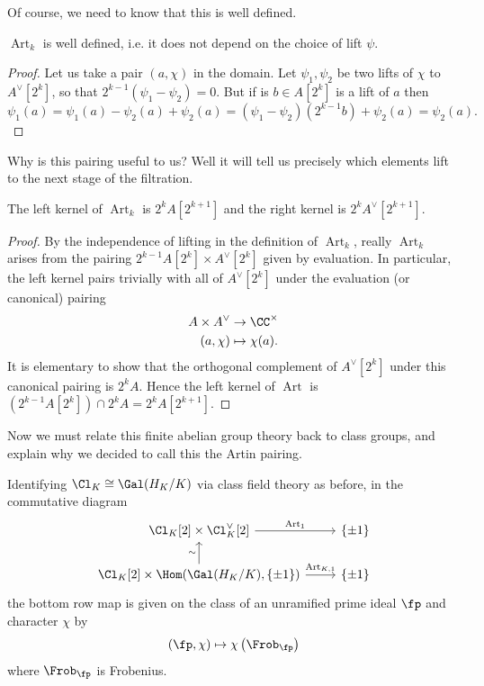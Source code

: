 \documentclass{lecturenotes}
\newcommand{\Art}{\operatorname{Art}}
\numberwithin{equation}{section}
\begin{document}
Of course, we need to know that this is well defined.
\begin{lemma}\label{lem:L2fact1}
    $\Art_k$ is well defined, i.e. it does not depend on the choice of lift $\psi$.
\end{lemma}
\begin{proof}
    Let us take a pair $(a,\chi)$ in the domain.  Let $\psi_1,\psi_2$ be two lifts of $\chi$ to $A^\vee[2^k]$, so that $2^{k-1}(\psi_1-\psi_2)=0$.  But if is $b\in A[2^k]$ is a lift of $a$ then 
    \[\psi_1(a)=\psi_1(a)-\psi_2(a)+\psi_2(a)=(\psi_1-\psi_2)(2^{k-1}b)+\psi_2(a)=\psi_2(a).\]
\end{proof}
Why is this pairing useful to us?  Well it will tell us precisely which elements lift to the next stage of the filtration.
\begin{lemma}\label{lem:L2fact2}
    The left kernel of $\Art_k$ is $2^kA[2^{k+1}]$ and the right kernel is $2^kA^\vee[2^{k+1}]$.
\end{lemma}
\begin{proof}
    By the independence of lifting in the definition of $\Art_k$, really $\Art_k$ arises from the pairing $2^{k-1}A[2^k]\times A^\vee[2^k]$ given by evaluation.  In particular, the left kernel pairs trivially with all of $A^\vee[2^k]$ under the evaluation (or canonical) pairing
    \begin{align*}
    A\times A^\vee&\to \CC^\times\\
    (a,\chi)&\mapsto \chi(a).
    \end{align*}
    It is elementary to show that the orthogonal complement of $A^\vee[2^k]$ under this canonical pairing is $2^kA$.  Hence the left kernel of $\Art$ is $(2^{k-1}A[2^k])\cap 2^kA=2^kA[2^{k+1}]$.
\end{proof}
Now we must relate this finite abelian group theory back to class groups, and explain why we decided to call this the Artin pairing.
\begin{lemma}\label{lem:L2fact3}  Identifying $\Cl_K\cong \Gal(H_K/K)$ via class field theory as before, in the commutative diagram
    \[\begin{tikzcd}
        \Cl_K[2]\times \Cl^\vee_K[2]\ar[r,"\Art_{1}"]&\set{\pm 1}\\
        \Cl_K[2]\times \Hom(\Gal(H_K/K), \set{\pm 1})\ar[r,"\Art_{K,1}"]\ar[u,"\sim"]&\set{\pm 1}
    \end{tikzcd}\]
    the bottom row map is given on the class of an unramified prime ideal $\fp$ and character $\chi$ by
    \[(\fp,\chi)\mapsto \chi\braces{\Frob_\fp}\]
    where $\Frob_\fp$ is Frobenius.
\end{lemma}
\end{document}

